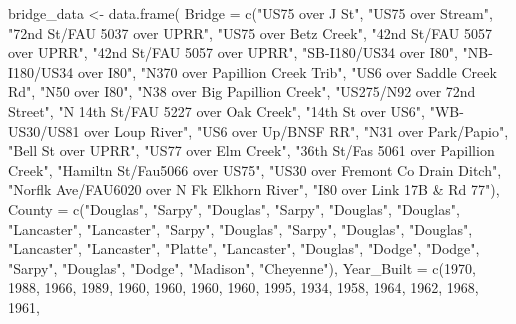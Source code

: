 \documentclass[
  letterpaper,
  DIV=11,
  numbers=noendperiod]{scrreprt}
\newenvironment{Shaded}{\begin{snugshade}}{\end{snugshade}}
\newcommand{\AttributeTok}[1]{\textcolor[rgb]{0.40,0.45,0.13}{#1}}
\newcommand{\DecValTok}[1]{\textcolor[rgb]{0.68,0.00,0.00}{#1}}
\newcommand{\FunctionTok}[1]{\textcolor[rgb]{0.28,0.35,0.67}{#1}}
\newcommand{\NormalTok}[1]{\textcolor[rgb]{0.00,0.23,0.31}{#1}}
\newcommand{\OtherTok}[1]{\textcolor[rgb]{0.00,0.23,0.31}{#1}}
\newcommand{\StringTok}[1]{\textcolor[rgb]{0.13,0.47,0.30}{#1}}
\begin{document}
\begin{Shaded}
\begin{Highlighting}[]
\NormalTok{bridge\_data }\OtherTok{\textless{}{-}} \FunctionTok{data.frame}\NormalTok{(}
  \AttributeTok{Bridge =} \FunctionTok{c}\NormalTok{(}\StringTok{"US75 over J St"}\NormalTok{, }\StringTok{"US75 over Stream"}\NormalTok{, }\StringTok{"72nd St/FAU 5037 over UPRR"}\NormalTok{, }\StringTok{"US75 over Betz Creek"}\NormalTok{, }
             \StringTok{"42nd St/FAU 5057 over UPRR"}\NormalTok{, }\StringTok{"42nd St/FAU 5057 over UPRR"}\NormalTok{, }\StringTok{"SB{-}I180/US34 over I80"}\NormalTok{, }
             \StringTok{"NB{-}I180/US34 over I80"}\NormalTok{, }\StringTok{"N370 over Papillion Creek Trib"}\NormalTok{, }\StringTok{"US6 over Saddle Creek Rd"}\NormalTok{, }
             \StringTok{"N50 over I80"}\NormalTok{, }\StringTok{"N38 over Big Papillion Creek"}\NormalTok{, }\StringTok{"US275/N92 over 72nd Street"}\NormalTok{, }
             \StringTok{"N 14th St/FAU 5227 over Oak Creek"}\NormalTok{, }\StringTok{"14th St over US6"}\NormalTok{, }\StringTok{"WB{-}US30/US81 over Loup River"}\NormalTok{, }
             \StringTok{"US6 over Up/BNSF RR"}\NormalTok{, }\StringTok{"N31 over Park/Papio"}\NormalTok{, }\StringTok{"Bell St over UPRR"}\NormalTok{, }\StringTok{"US77 over Elm Creek"}\NormalTok{, }
             \StringTok{"36th St/Fas 5061 over Papillion Creek"}\NormalTok{, }\StringTok{"Hamiltn St/Fau5066 over US75"}\NormalTok{, }\StringTok{"US30 over Fremont Co Drain Ditch"}\NormalTok{, }
             \StringTok{"Norflk Ave/FAU6020 over N Fk Elkhorn River"}\NormalTok{, }\StringTok{"I80 over Link 17B \& Rd 77"}\NormalTok{),}
  \AttributeTok{County =} \FunctionTok{c}\NormalTok{(}\StringTok{"Douglas"}\NormalTok{, }\StringTok{"Sarpy"}\NormalTok{, }\StringTok{"Douglas"}\NormalTok{, }\StringTok{"Sarpy"}\NormalTok{, }\StringTok{"Douglas"}\NormalTok{, }\StringTok{"Douglas"}\NormalTok{, }\StringTok{"Lancaster"}\NormalTok{, }\StringTok{"Lancaster"}\NormalTok{, }
             \StringTok{"Sarpy"}\NormalTok{, }\StringTok{"Douglas"}\NormalTok{, }\StringTok{"Sarpy"}\NormalTok{, }\StringTok{"Douglas"}\NormalTok{, }\StringTok{"Douglas"}\NormalTok{, }\StringTok{"Lancaster"}\NormalTok{, }\StringTok{"Lancaster"}\NormalTok{, }\StringTok{"Platte"}\NormalTok{, }
             \StringTok{"Lancaster"}\NormalTok{, }\StringTok{"Douglas"}\NormalTok{, }\StringTok{"Dodge"}\NormalTok{, }\StringTok{"Dodge"}\NormalTok{, }\StringTok{"Sarpy"}\NormalTok{, }\StringTok{"Douglas"}\NormalTok{, }\StringTok{"Dodge"}\NormalTok{, }\StringTok{"Madison"}\NormalTok{, }\StringTok{"Cheyenne"}\NormalTok{),}
  \AttributeTok{Year\_Built =} \FunctionTok{c}\NormalTok{(}\DecValTok{1970}\NormalTok{, }\DecValTok{1988}\NormalTok{, }\DecValTok{1966}\NormalTok{, }\DecValTok{1989}\NormalTok{, }\DecValTok{1960}\NormalTok{, }\DecValTok{1960}\NormalTok{, }\DecValTok{1960}\NormalTok{, }\DecValTok{1960}\NormalTok{, }\DecValTok{1995}\NormalTok{, }\DecValTok{1934}\NormalTok{, }\DecValTok{1958}\NormalTok{, }\DecValTok{1964}\NormalTok{, }\DecValTok{1962}\NormalTok{, }\DecValTok{1968}\NormalTok{, }\DecValTok{1961}\NormalTok{, }

\end{Highlighting}
\end{Shaded}
\end{document}
